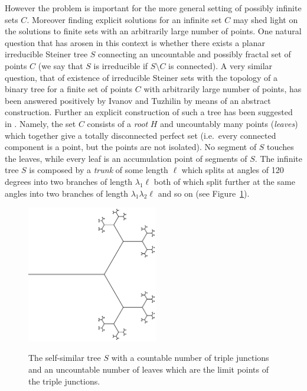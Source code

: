 \documentclass{amsart}
\theoremstyle{definition}
\theoremstyle{remark}
\begin{document}
However the problem is important for the more general setting of possibly infinite 
sets $C$. 
Moreover finding explicit solutions for an infinite set $C$ may shed light on 
the solutions to finite sets with an arbitrarily large number of points.
One natural question that has arosen in this context is 
whether there exists a planar irreducible Steiner tree $S$ connecting an uncountable 
and possibly fractal set of points $C$ 
(we say that $S$ is irreducible if $S\setminus C$ is 
connected).
A very similar question,
that of existence of irreducible Steiner sets with the topology 
of a binary tree for a finite set of points $C$ with arbitrarily 
large number of points, has been answered positively by Ivanov and 
Tuzhilin \cite{IvaTuz94} by means of an abstract construction.
Further an explicit construction of such a tree has been suggested 
in \cite{PaoSteTep15}.
Namely, the set $C$ consists of a \emph{root} $H$ and uncountably many
points (\emph{leaves}) which together give a totally disconnected perfect set 
(i.e.\ every connected component is a point, but the points are not isolated).
No segment of $S$
touches the leaves, while every leaf is an accumulation point of
segments of $S$.
The infinite tree $S$ 
is composed by a \emph{trunk} of
some length $\ell$ which splits at angles of 120 degrees 
into two branches of length $\lambda_1 \ell$ 
both of which split further at the same angles into two branches of length
$\lambda_1\lambda_2\ell$ and so on (see Figure~\ref{fig:tree}).
\begin{figure}
  \centering 
  \includegraphics[height=6cm]{tree.pdf}
  \label{fig:tree}
  \caption{The self-similar tree $S$ with a countable 
  number of triple junctions and an uncountable number 
  of leaves which are the limit points of the triple 
  junctions.}
\end{figure}
\end{document}
